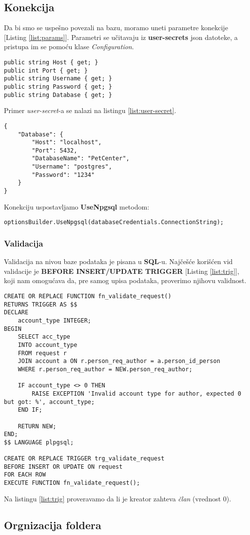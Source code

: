 \subsection*{Konekcija}
\par Da bi smo se uspešno povezali na bazu, moramo uneti parametre konekcije [Listing \ref{list:params}]. Parametri se učitavaju iz
\textbf{user-secrets} json datoteke, a pristupa im se pomoću klase \textit{Configuration}.
\begin{lstlisting}[caption={Parametri konekcije}, captionpos=b, label={list:params}]
public string Host { get; }
public int Port { get; }
public string Username { get; }
public string Password { get; }
public string Database { get; }
\end{lstlisting}
\par Primer \textit{user-secret}-a se nalazi na listingu \ref{list:user-secret}.
\begin{lstlisting}[caption={Primer \textit{user-secret}}, captionpos=b, label={list:user-secret}]
{
    "Database": {
        "Host": "localhost",
        "Port": 5432,
        "DatabaseName": "PetCenter",
        "Username": "postgres",
        "Password": "1234"
    }
}
\end{lstlisting}
\par Konekciju uspostavljamo \textbf{UseNpgsql} metodom:
\begin{lstlisting}[caption={Uspostavljanje konekcije}, captionpos=b]
optionsBuilder.UseNpgsql(databaseCredentials.ConnectionString);
\end{lstlisting}
\subsubsection*{Validacija}
\par Validacija na nivou baze podataka je pisana u \textbf{SQL}-u. Najčešće korišćen
vid validacije je \textbf{BEFORE INSERT/UPDATE TRIGGER} [Listing \ref{list:trig}], koji nam omogućava da, pre samog upisa podataka, proverimo njihovu validnost.
\begin{lstlisting}[caption={Primer validacije pomoću trigera}, captionpos=b, label=list:trig]
CREATE OR REPLACE FUNCTION fn_validate_request()
RETURNS TRIGGER AS $$
DECLARE
	account_type INTEGER;
BEGIN
	SELECT acc_type
	INTO account_type
	FROM request r
	JOIN account a ON r.person_req_author = a.person_id_person
	WHERE r.person_req_author = NEW.person_req_author;

	IF account_type <> 0 THEN
		RAISE EXCEPTION 'Invalid account type for author, expected 0 but got: %', account_type;
	END IF;

	RETURN NEW;
END;
$$ LANGUAGE plpgsql;

CREATE OR REPLACE TRIGGER trg_validate_request
BEFORE INSERT OR UPDATE ON request
FOR EACH ROW
EXECUTE FUNCTION fn_validate_request();
\end{lstlisting}
\par Na listingu \ref{list:trig} proveravamo da li je kreator zahteva \textit{član} (vrednost 0).
\subsection{Orgnizacija foldera}